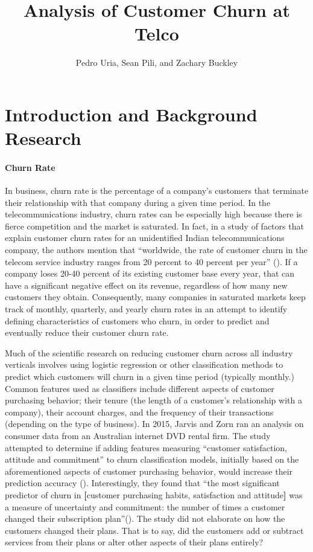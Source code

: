 \documentclass[man, floatsintext]{apa6}
\title{Analysis of Customer Churn at Telco}
\author{Pedro Uria, Sean Pili, and Zachary Buckley}
\affiliation{George Washington University}
\begin{document}
\maketitle

\section{Introduction and Background Research}
\paragraph{Churn Rate}

In business, churn rate is the percentage of a company's customers that terminate their relationship with that company during a given time period. In the telecommunications industry, churn rates can be especially high because there is fierce competition and the market is saturated. In fact, in a study of factors that explain customer churn rates for an unidentified Indian telecommunications company, the authors mention that ``worldwide, the rate of customer churn in the telecom service industry ranges from 20 percent to 40 percent per year'' (\cite[p.~224]{Asamoah_2018}). If a company loses 20-40 percent of its existing customer base every year, that can have a significant negative effect on its revenue, regardless of how many new customers they obtain.  Consequently, many companies in saturated markets keep track of monthly, quarterly, and yearly churn rates in an attempt to identify defining characteristics of customers who churn, in order to predict and eventually reduce their customer churn rate.

Much of the scientific research on reducing customer churn across all industry verticals involves using logistic regression or other classification methods to predict which customers will churn in a given time period (typically monthly.) Common features used as classifiers include different aspects of customer purchasing behavior; their tenure (the length of a customer's relationship with a company), their account charges, and the frequency of their transactions (depending on the type of business). In 2015, Jarvis and Zorn ran an analysis on consumer data from an Australian internet DVD rental firm. The study attempted to determine if adding features measuring ``customer satisfaction, attitude and commitment'' to churn classification models, initially based on the aforementioned aspects of customer purchasing behavior, would increase their prediction accuracy (). Interestingly, they found that ``the most significant predictor of churn in \textbf{[}customer purchasing habits, satisfaction and attitude\textbf{]} was a measure of uncertainty and commitment: the number of times a customer changed their subscription plan''(). The study did not elaborate on how the customers changed their plans. That is to say, did the customers add or subtract services from their plans or alter other aspects of their plans entirely?
\end{document}
